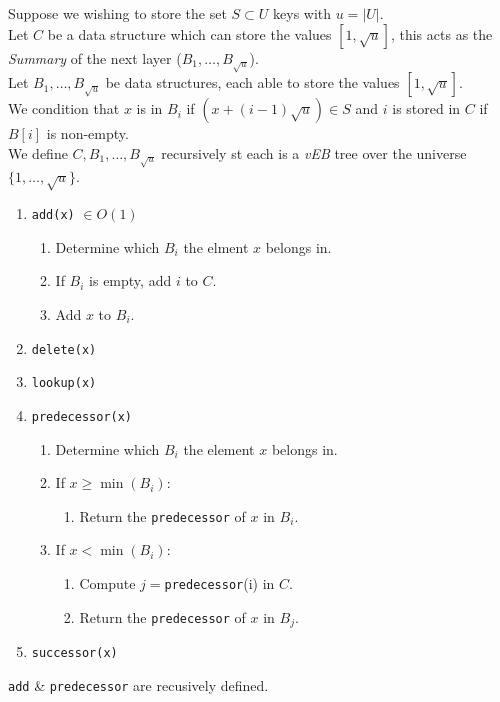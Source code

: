 \documentclass[11pt,a4paper]{article}
\begin{document}
Suppose we wishing to store the set $S\subset U$ keys with $u=|U|$.\\
Let $C$ be a data structure which can store the values $[1,\sqrt{u}]$, this acts as the \textit{Summary} of the next layer ($B_1,\dots,B_{\sqrt{u}}$).\\
Let $B_1,\dots,B_{\sqrt{u}}$ be data structures, each able to store the values $[1,\sqrt{u}]$.\\
We condition that $x$ is in $B_i$ if $(x+(i-1)\sqrt{u})\in S$ and $i$ is stored in $C$ if $B[i]$ is non-empty.\\
We define $C,B_1,\dots,B_{\sqrt{u}}$ recursively st each is a \textit{vEB} tree over the universe $\{1,\dots,\sqrt{u}\}$.
\begin{enumerate}
	\item \lstinline!add(x)! $\in O(1)$
	\begin{enumerate}
		\item Determine which $B_i$ the elment $x$ belongs in.
		\item If $B_i$ is empty, add $i$ to $C$.
		\item Add $x$ to $B_i$.
	\end{enumerate}
	\item \lstinline!delete(x)!
	\item \lstinline!lookup(x)!
	\item \lstinline!predecessor(x)!
	\begin{enumerate}
		\item Determine which $B_i$ the element $x$ belongs in.
		\item If $x\geq\min(B_i)$:
		\begin{enumerate}
			\item Return the \lstinline!predecessor! of $x$ in $B_i$.
		\end{enumerate}
		\item If $x<\min(B_i)$:
		\begin{enumerate}
			\item Compute $j=$\lstinline!predecessor!(i) in $C$.
			\item Return the \lstinline!predecessor! of $x$ in $B_j$.
		\end{enumerate}
	\end{enumerate}
	\item \lstinline!successor(x)! 
\end{enumerate}
\nb \lstinline!add! \& \lstinline!predecessor! are recusively defined.\\
\end{document}
